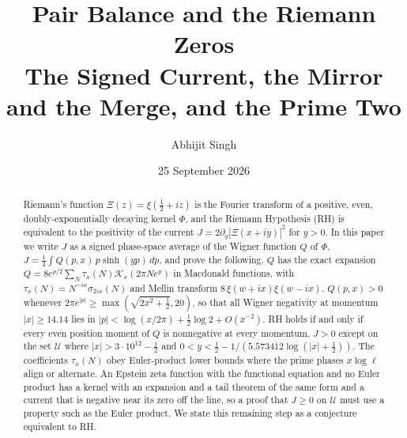 \documentclass[11pt]{article}
\title{\textbf{Pair Balance and the Riemann Zeros}\\[4pt]
\large The Signed Current, the Mirror and the Merge, and the Prime Two}
\author{Abhijit Singh}
\date{25 September 2026}
\theoremstyle{definition}\newtheorem{definition}[theorem]{Definition}
\theoremstyle{remark}\newtheorem{remark}[theorem]{Remark}
\begin{document}
\maketitle
\begin{abstract}
Riemann's function $\Xi(z)=\xi(\frac12+iz)$ is the Fourier transform of a positive, even, doubly-exponentially decaying kernel $\Phi$, and the Riemann Hypothesis (RH) is equivalent to the positivity of the current $J=2\partial_y|\Xi(x+iy)|^2$ for $y>0$. In this paper we write $J$ as a signed phase-space average of the Wigner function $Q$ of $\Phi$, $J=\frac14\int Q(p,x)\,p\sinh(yp)\,dp$, and prove the following. $Q$ has the exact expansion $Q=8e^{p/2}\sum_N\tau_x(N)\mathcal K_x(2\pi Ne^p)$ in Macdonald functions, with $\tau_x(N)=N^{-ix}\sigma_{2ix}(N)$ and Mellin transform $8\,\xi(w+ix)\xi(w-ix)$. $Q(p,x)>0$ whenever $2\pi e^{|p|}\ge\max(\sqrt{2x^2+\frac12},20)$, so that all Wigner negativity at momentum $|x|\ge14.14$ lies in $|p|<\log(x/2\pi)+\frac12\log2+O(x^{-2})$. RH holds if and only if every even position moment of $Q$ is nonnegative at every momentum. $J>0$ except on the set $\mathcal U$ where $|x|>3\cdot10^{12}-\frac12$ and $0<y<\frac12-1/(5.573412\log(|x|+\frac12))$. The coefficients $\tau_x(N)$ obey Euler-product lower bounds where the prime phases $x\log\ell$ align or alternate. An Epstein zeta function with the functional equation and no Euler product has a kernel with an expansion and a tail theorem of the same form and a current that is negative near its zero off the line, so a proof that $J\ge0$ on $\mathcal U$ must use a property such as the Euler product. We state this remaining step as a conjecture equivalent to RH.


\end{abstract}
\end{document}
